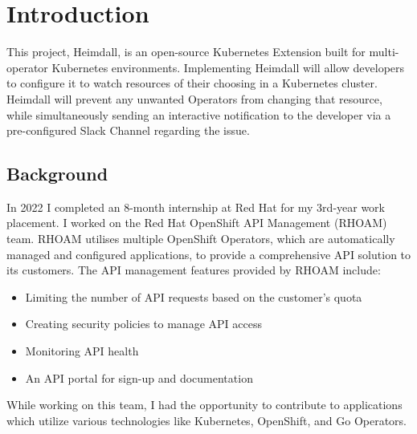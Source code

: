 \documentclass{article}
\begin{document}
\newpage
\section{Introduction}
This project, Heimdall, is an open-source Kubernetes Extension built for multi-operator Kubernetes environments. Implementing Heimdall will allow developers to configure it to watch resources of their choosing in a Kubernetes cluster. Heimdall will prevent any unwanted Operators from changing that resource, while simultaneously sending an interactive notification to the developer via a pre-configured Slack Channel regarding the issue. 



\subsection{Background}
In 2022 I completed an 8-month internship at Red Hat for my 3rd-year work placement. I worked on the Red Hat OpenShift API Management (RHOAM) team. RHOAM utilises multiple OpenShift Operators, which are automatically managed and configured applications, to provide a comprehensive API solution to its customers. The API management features provided by RHOAM include: \cite{rhoam-overview}
\begin{itemize}
    \itemsep0em 
    \item Limiting the number of API requests based on the customer’s quota
    \item Creating security policies to manage API access
    \item Monitoring API health
    \item An API portal for sign-up and documentation
\end{itemize}
While working on this team, I had the opportunity to contribute to applications which utilize various technologies like Kubernetes, OpenShift, and Go Operators.
\end{document}
